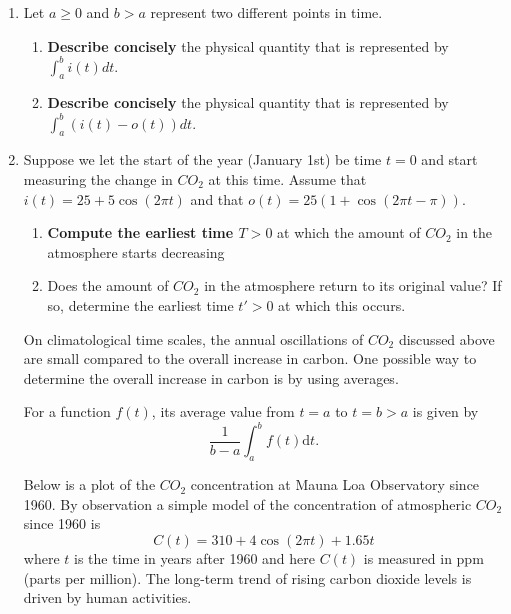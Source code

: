\documentclass{exam}
\begin{document}
\begin{enumerate}
    \item  Let $a \geq 0$ and $b > a$ represent two different points in time. 
    \begin{enumerate}
            \item \textbf{Describe concisely} the physical quantity that is represented by $\int_a^b i(t)dt$.

      
        
            \item \textbf{Describe concisely} the physical quantity that is represented by $\int_a^b \left(i(t) - o(t)\right)dt$.

         
            \end{enumerate}

    \item Suppose we let the start of the year (January 1st) be time $t=0$ and start measuring the change in $CO_2$ at this time. Assume that $i(t)=25+5 \cos (2 \pi t)$ and that $o(t)=25(1+\cos(2 \pi t - \pi))$.

        \begin{enumerate}
            \item \textbf{Compute the earliest time $T>0$} at which the amount of $CO_2$ in the atmosphere starts decreasing

    

            \item Does the amount of $CO_2$ in the atmosphere  return to its original value? If so, determine the earliest time $t'>0$ at which this occurs.

         
            
        \end{enumerate}


On climatological time scales, the annual oscillations of $CO_2$ discussed above are small compared to the overall increase in carbon. One possible way to determine the overall increase in carbon is by using averages.

    For a function $f(t)$, its average value from $t=a$ to $t=b>a$ is given by
    \[\dfrac{1}{b-a}\int_a^bf(t)\text{d}t.\]

   Below is a plot of the $CO_2$ concentration at Mauna Loa Observatory since 1960. By observation a simple model of the concentration of atmospheric $CO_2$ since 1960 is \[C(t)=310+4 \cos(2\pi t) +1.65 t\] where $t$ is the time in years after 1960 and here $C(t)$ is measured in ppm (parts per million). The long-term trend of rising carbon dioxide levels is driven by human activities.


\end{enumerate}
\end{document}
